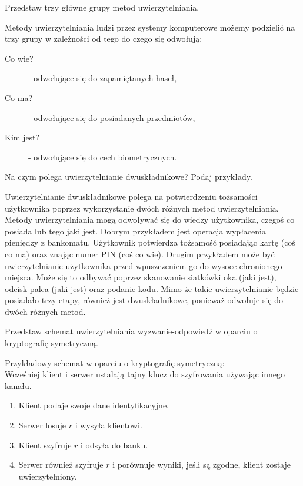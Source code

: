 \documentclass[answers,11pt]{exam}
\begin{document}
\begin{questions}
\question Przedstaw trzy główne grupy metod uwierzytelniania.
\begin{solution}
Metody uwierzytelniania ludzi przez systemy komputerowe możemy podzielić na trzy grupy w zależności od tego do czego się odwołują:
\begin{description}
\item[Co wie?] - odwołujące się do zapamiętanych haseł,
\item[Co ma?] - odwołujące się do posiadanych przedmiotów,
\item[Kim jest?] - odwołujące się do cech biometrycznych.
\end{description}
\end{solution}

\question Na czym polega uwierzytelnianie dwuskładnikowe? Podaj przykłady.
\begin{solution}
Uwierzytelnianie dwuskładnikowe polega na potwierdzeniu tożsamości użytkownika poprzez wykorzystanie dwóch różnych metod uwierzytelniania. Metody uwierzytelniania mogą odwoływać się do wiedzy użytkownika, czegoś co posiada lub tego jaki jest. Dobrym przykładem jest operacja wypłacenia pieniędzy z bankomatu. Użytkownik potwierdza tożsamość posiadając kartę (coś co ma) oraz znając numer PIN (coś co wie). Drugim przykładem może być uwierzytelnianie użytkownika przed wpuszczeniem go do wysoce chronionego miejsca. Może się to odbywać poprzez skanowanie siatkówki oka (jaki jest), odcisk palca (jaki jest) oraz podanie kodu. Mimo że takie uwierzytelnianie będzie posiadało trzy etapy, również jest dwuskładnikowe, ponieważ odwołuje się do dwóch różnych metod.
\end{solution}

\question Przedstaw schemat uwierzytelniania wyzwanie-odpowiedź w oparciu o kryptografię symetryczną.
\begin{solution}
Przykładowy schemat w oparciu o kryptografię symetryczną:\\
Wcześniej klient i serwer ustalają tajny klucz do szyfrowania używając innego kanału.
\begin{enumerate}
\item Klient podaje swoje dane identyfikacyjne.
\item Serwer losuje $r$ i wysyła klientowi.
\item Klient szyfruje $r$ i odsyła do banku.
\item Serwer również szyfruje $r$ i porównuje wyniki, jeśli są zgodne, klient zostaje uwierzytelniony.
\end{enumerate}
\end{solution}


\end{questions}
\end{document}
